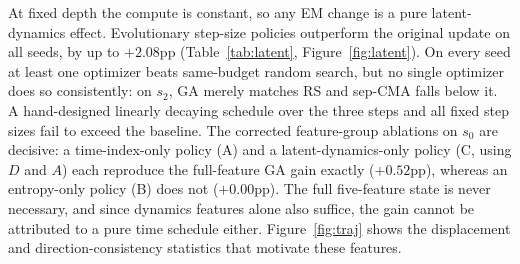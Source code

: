 \documentclass[11pt]{article}
\begin{document}
\begin{table}[H]
\centering
\small
\setlength{\tabcolsep}{4pt}
\caption{Step-size policies improve fixed-depth exact match at constant compute. Fixed-depth (constant $N_{\mathrm{cell}}$) improvements over the original $\alpha{\approx}1$ update on the inner subset ($n{=}192$); all searches use exactly 336 evaluations. A hand-designed linearly decaying schedule ($\alpha_k = 1.0-0.5k/K$, i.e., $[1.0, 0.833, 0.667]$ at depth 3) and fixed $\alpha \in \{0.75, 0.5, 0.25\}$ never exceed the $\alpha{\approx}1$ baseline. Ablations on $s_0$ restrict the policy input to a single feature group under the corrected masks of \S\ref{sec:negative}; the full-feature GA result corresponds to the GA column.}
\label{tab:latent}
\end{table}

At fixed depth the compute is constant, so any EM change is a pure latent-dynamics effect. Evolutionary step-size policies outperform the original update on all seeds, by up to $+2.08$pp (Table~\ref{tab:latent}, Figure~\ref{fig:latent}). On every seed at least one optimizer beats same-budget random search, but no single optimizer does so consistently: on $s_2$, GA merely matches RS and sep-CMA falls below it. A hand-designed linearly decaying schedule over the three steps and all fixed step sizes fail to exceed the baseline. The corrected feature-group ablations on $s_0$ are decisive: a time-index-only policy (A) and a latent-dynamics-only policy (C, using $D$ and $A$) each reproduce the full-feature GA gain exactly ($+0.52$pp), whereas an entropy-only policy (B) does not ($+0.00$pp). The full five-feature state is never necessary, and since dynamics features alone also suffice, the gain cannot be attributed to a pure time schedule either. Figure~\ref{fig:traj} shows the displacement and direction-consistency statistics that motivate these features.
\end{document}
